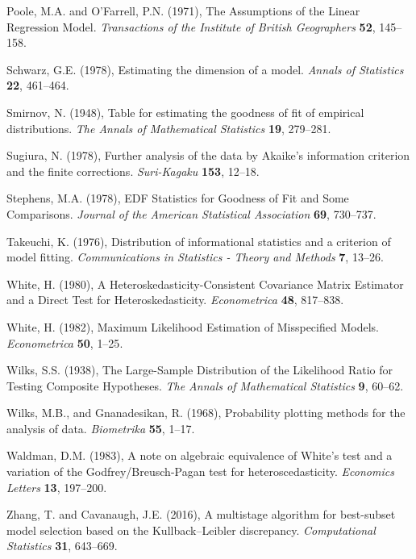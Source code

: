 \phantom{a}

\rff Poole, M.A. and O'Farrell, P.N. (1971),
      The Assumptions of the Linear Regression Model.
      {\it Transactions of the Institute of British Geographers}
      {\bf 52}, {145--158}.

\phantom{a}

\rff Schwarz, G.E. (1978),
      Estimating the dimension of a model.
      {\it Annals of Statistics}
      {\bf 22}, {461--464}.

\phantom{a}

\rff Smirnov, N. (1948),
    Table for estimating the goodness of fit of empirical distributions.
    {\it The Annals of Mathematical Statistics}
    {\bf 19}, {279--281}.

\phantom{a}

\rff Sugiura, N. (1978),
      Further analysis of the data by Akaike's information criterion and the finite corrections.
      {\it Suri-Kagaku}
      {\bf 153}, {12--18}.

\phantom{a}

\rff Stephens, M.A. (1978),
      EDF Statistics for Goodness of Fit and Some Comparisons.
      {\it Journal of the American Statistical Association}
      {\bf 69}, {730--737}.

\phantom{a}

\rff Takeuchi, K. (1976),
      Distribution of informational statistics and a criterion of model fitting.
      {\it Communications in Statistics - Theory and Methods}
      {\bf 7}, {13--26}.

\phantom{a}

\rff White, H. (1980),
      A Heteroskedasticity-Consistent Covariance Matrix Estimator and a Direct Test for Heteroskedasticity.
      {\it Econometrica}
      {\bf 48}, {817--838}.

\phantom{a}

\rff White, H. (1982),
      Maximum Likelihood Estimation of Misspecified Models.
      {\it Econometrica}
      {\bf 50}, {1--25}.

\phantom{a}

\rff Wilks, S.S. (1938),
      The Large-Sample Distribution of the Likelihood Ratio for Testing Composite Hypotheses.
      {\it The Annals of Mathematical Statistics}
      {\bf 9}, {60--62}.

\phantom{a}

\rff Wilks, M.B., and Gnanadesikan, R. (1968),
      Probability plotting methods for the analysis of data.
      {\it Biometrika}
      {\bf 55}, {1--17}.

\phantom{a}

\rff Waldman, D.M. (1983),
      A note on algebraic equivalence of White's test and a variation of the Godfrey/Breusch-Pagan test for heteroscedasticity.
      {\it Economics Letters}
      {\bf 13}, {197--200}.

\phantom{a}

\rff Zhang, T. and  Cavanaugh, J.E. (2016),
      A multistage algorithm for best-subset model selection based on the Kullback–Leibler discrepancy.
      {\it Computational Statistics}
      {\bf 31}, {643--669}.